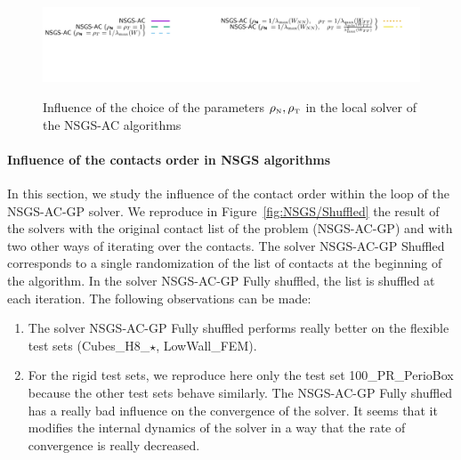 \begin{figure}
{\includegraphics[height=\legendheight]{figure/NSGS/rho/1.0e-08/50/time/profile-Chain_legend.pdf}}
  \caption{Influence of the choice of the parameters $\rho_{\hbox{\tiny{N}}}, \rho_{\hbox{\tiny{T}}}$ in the local solver of the {\sf NSGS-AC} algorithms }
  \label{fig:NSGS/rho}
\end{figure}



\paragraph{Influence of the contacts order  in NSGS algorithms}
In this section, we study the influence of the contact order within the loop of the {\sf NSGS-AC-GP} solver. We reproduce in Figure~\ref{fig:NSGS/Shuffled} the result of the solvers with the original contact list of the problem ({\sf NSGS-AC-GP}) and with two other ways of iterating over the contacts. The solver {\sf NSGS-AC-GP Shuffled} corresponds to a single randomization of the list of contacts at the beginning of the algorithm. In the solver  {\sf NSGS-AC-GP Fully shuffled}, the  list is shuffled at each iteration. The following observations can be made:
\begin{enumerate}
\item The solver  {\sf NSGS-AC-GP Fully shuffled} performs really better on the flexible test sets (Cubes\_H8\_$\star$, LowWall\_FEM).
\item For the rigid test sets, we reproduce here only the test set  100\_PR\_PerioBox because the other test sets behave similarly. The  {\sf NSGS-AC-GP Fully shuffled} has a really bad influence on the convergence of the solver. It seems that it modifies the internal dynamics of the solver in a way that the rate of convergence is really decreased.
\end{enumerate}
